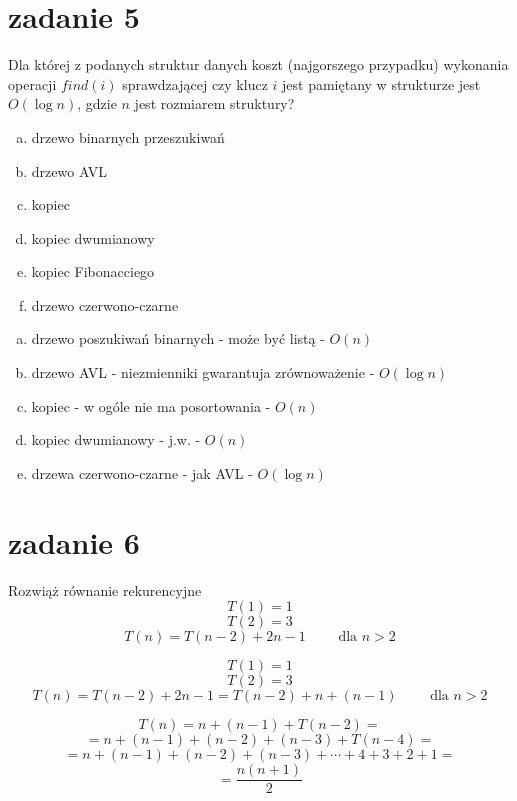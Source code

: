 \section{zadanie 5}
\begin{framed}
Dla której z podanych struktur danych koszt (najgorszego przypadku) wykonania operacji $find(i)$ sprawdzającej czy klucz $i$ jest pamiętany w strukturze jest $O(\log n)$, gdzie $n$ jest rozmiarem struktury?
\begin{enumerate}[a)]
	\item drzewo binarnych przeszukiwań
	\item drzewo AVL
	\item kopiec
	\item kopiec dwumianowy
	\item kopiec Fibonacciego
	\item drzewo czerwono-czarne
\end{enumerate}
\end{framed}
\begin{enumerate}[a)]
\item drzewo poszukiwań binarnych - może być listą - $O(n)$
\item drzewo AVL - niezmienniki gwarantuja zrównoważenie - $O(\log n)$
\item kopiec -  w ogóle nie ma posortowania - $O(n)$
\item kopiec dwumianowy - j.w. - $O(n)$
\item drzewa czerwono-czarne - jak AVL - $O(\log n)$
\end{enumerate}

\section{zadanie 6}
\begin{framed}
Rozwiąż równanie rekurencyjne
$$ T(1)=1$$
$$ T(2)=3$$
$$ T(n)=T(n-2)+2n-1 \qquad \mbox{ dla $n >2$} $$
\end{framed}
$$ T(1)=1$$
$$ T(2)=3$$
$$ T(n)=T(n-2)+2n-1=T(n-2)+n+(n-1) \qquad \mbox{ dla $n >2$} $$

$$ T(n)=n+(n-1)+T(n-2)=$$
$$ = n+(n-1)+(n-2)+(n-3)+T(n-4)=$$
$$ = n+(n-1)+(n-2)+(n-3)+\cdots+4+3+2+1=$$
$$= \frac {n(n+1)} 2$$


